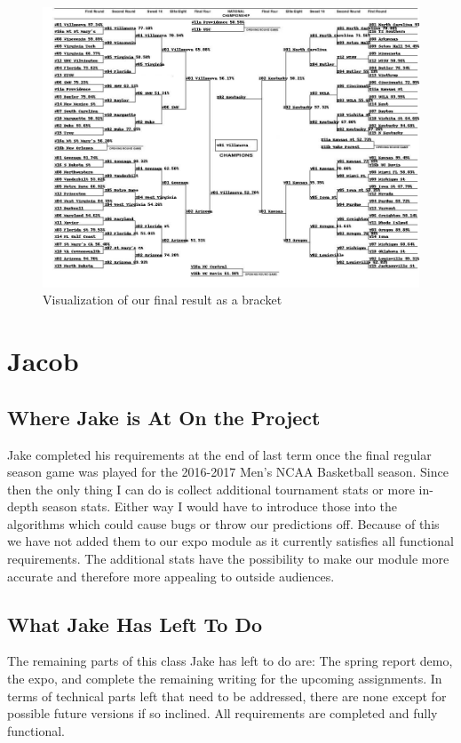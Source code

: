 \documentclass[onecolumn, draftclsnofoot,10pt, compsoc]{IEEEtran}
\begin{document}
\begin{figure}[H]
\centering
\includegraphics[width=1\textwidth]{images/bracket.jpg}
\caption{Visualization of our final result as a bracket}
\label{fig8}
\end{figure}


\section{Jacob}

\subsection{Where Jake is At On the Project}
Jake completed his requirements at the end of last term once the final regular season game was played for the 2016-2017 Men’s NCAA Basketball season. Since then the only thing I can do is collect additional tournament stats or more in-depth season stats. Either way I would have to introduce those into the algorithms which could cause bugs or throw our predictions off. Because of this we have not added them to our expo module as it currently satisfies all functional requirements.  The additional stats have the possibility to make our module more accurate and therefore more appealing to outside audiences.

\subsection{What Jake Has Left To Do}
The remaining parts of this class Jake has left to do are: The spring report demo, the expo, and complete the remaining writing for the upcoming assignments. In terms of technical parts left that need to be addressed, there are none except for possible future versions if so inclined. All requirements are completed and fully functional.
\end{document}
